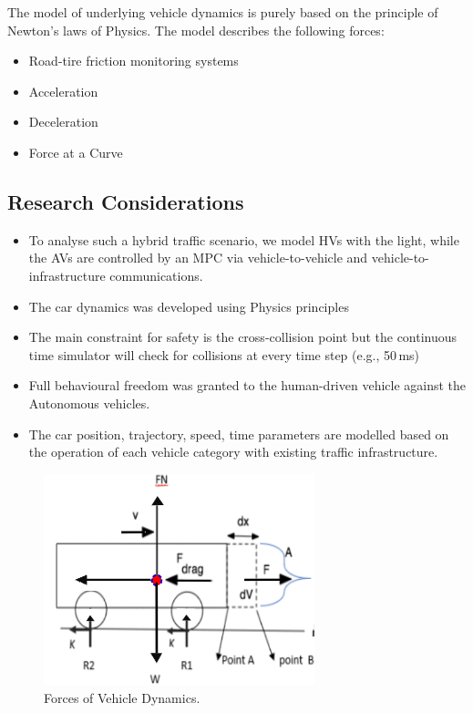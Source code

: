 \documentclass{book}
\begin{document}
The model of underlying vehicle dynamics is purely based on the principle of Newton’s laws of Physics. The model describes the following forces:
\begin {itemize}
\item Road-tire friction monitoring systems
\item Acceleration
\item Deceleration
\item Force at a Curve
\end{itemize}


\subsection{Research Considerations }

  \begin{itemize}
	    \item To analyse such a hybrid traffic scenario, we  model HVs with the  light, while the AVs are  controlled by an MPC via vehicle-to-vehicle and vehicle-to-infrastructure communications.
	    \item The car dynamics was developed using Physics principles
	    \item The main constraint for safety is the cross-collision point but the continuous time simulator will check for collisions at every time step (e.g., 50\,ms)
	    \item Full behavioural freedom was granted to the human-driven vehicle against the Autonomous vehicles.
	    \item The car position, trajectory, speed, time parameters are modelled based on the operation of each vehicle category with existing traffic infrastructure.
	\end{itemize}

\begin{figure}
\centering
\includegraphics[width=0.7\textwidth]{cardynamics}
\caption{Forces of Vehicle Dynamics.}
\label{fig:cardynamics}
\end{figure}
\end{document}
